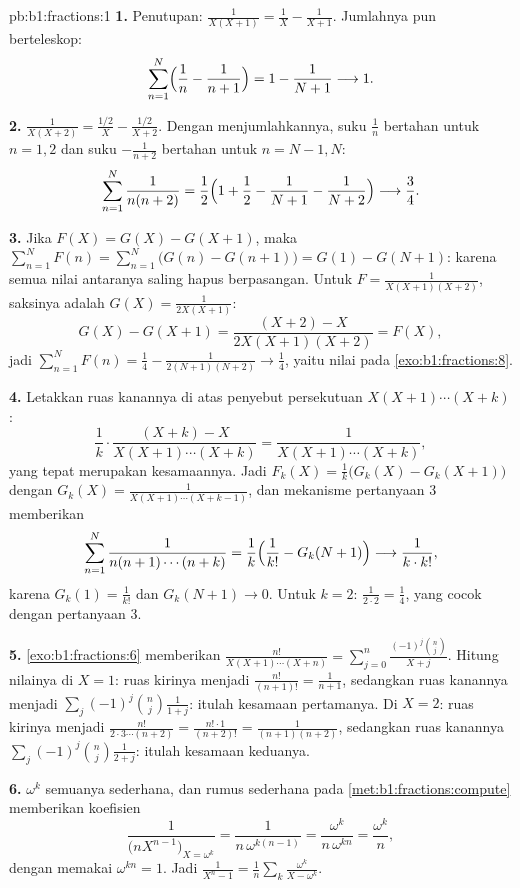 \begin{solution}{pb:b1:fractions:1}
\textbf{1.} Penutupan: $\frac1{X(X+1)} = \frac1X - \frac1{X+1}$.
Jumlahnya pun berteleskop:
\[
\sum_{n=1}^{N}\Bigl(\frac1n - \frac1{n+1}\Bigr)
= 1 - \frac1{N+1} \longrightarrow 1 .
\]

\textbf{2.} $\frac1{X(X+2)} = \frac{1/2}X - \frac{1/2}{X+2}$.
Dengan menjumlahkannya, suku $\frac1n$ bertahan untuk $n = 1, 2$ dan suku
$-\frac1{n+2}$ bertahan untuk $n = N-1, N$:
\[
\sum_{n=1}^{N}\frac1{n(n+2)}
= \frac12\Bigl(1 + \frac12 - \frac1{N+1} - \frac1{N+2}\Bigr)
\longrightarrow \frac34 .
\]

\textbf{3.} Jika $F(X) = G(X) - G(X+1)$, maka $\sum_{n=1}^N F(n) =
\sum_{n=1}^N\bigl(G(n) - G(n+1)\bigr) = G(1) - G(N+1)$: karena semua
nilai antaranya saling hapus berpasangan. Untuk $F =
\frac1{X(X+1)(X+2)}$, saksinya adalah $G(X) = \frac1{2X(X+1)}$:
\[
G(X) - G(X+1)
= \frac{(X+2) - X}{2X(X+1)(X+2)} = F(X) ,
\]
jadi $\sum_{n=1}^N F(n) = \frac14 - \frac1{2(N+1)(N+2)} \to
\frac14$, yaitu nilai pada \cref{exo:b1:fractions:8}.

\textbf{4.} Letakkan ruas kanannya di atas penyebut persekutuan
$X(X+1)\cdots(X+k)$:
\[
\frac1k\cdot\frac{(X + k) - X}{X(X+1)\cdots(X+k)}
= \frac{1}{X(X+1)\cdots(X+k)} ,
\]
yang tepat merupakan kesamaannya. Jadi $F_k(X) = \frac1k\bigl(G_k(X) -
G_k(X+1)\bigr)$ dengan $G_k(X) = \frac1{X(X+1)\cdots(X+k-1)}$, dan
mekanisme pertanyaan 3 memberikan
\[
\sum_{n=1}^{N}\frac1{n(n+1)\cdots(n+k)}
= \frac1k\Bigl(\frac1{k!} - G_k(N+1)\Bigr)
\longrightarrow \frac1{k\cdot k!} ,
\]
karena $G_k(1) = \frac1{k!}$ dan $G_k(N+1) \to 0$. Untuk $k = 2$:
$\frac1{2\cdot2} = \frac14$, yang cocok dengan pertanyaan 3.

\textbf{5.} \cref{exo:b1:fractions:6} memberikan
$\frac{n!}{X(X+1)\cdots(X+n)} = \sum_{j=0}^n
\frac{(-1)^j\binom nj}{X + j}$. Hitung nilainya di $X = 1$: ruas kirinya
menjadi $\frac{n!}{(n+1)!} = \frac1{n+1}$, sedangkan ruas kanannya menjadi
$\sum_j(-1)^j\binom nj\frac1{1+j}$: itulah kesamaan pertamanya. Di $X = 2$:
ruas kirinya menjadi $\frac{n!}{2\cdot3\cdots(n+2)} =
\frac{n!\cdot1}{(n+2)!} = \frac1{(n+1)(n+2)}$, sedangkan ruas kanannya
$\sum_j(-1)^j\binom nj\frac1{2+j}$: itulah kesamaan keduanya.

\textbf{6.}  $\omega^k$ semuanya sederhana, dan rumus 
sederhana pada \cref{met:b1:fractions:compute} memberikan koefisien
\[
\frac{1}{\bigl(nX^{n-1}\bigr)_{X = \omega^k}}
= \frac{1}{n\,\omega^{k(n-1)}}
= \frac{\omega^k}{n\,\omega^{kn}} = \frac{\omega^k}n ,
\]
dengan memakai $\omega^{kn} = 1$. Jadi $\frac1{X^n-1} = \frac1n\sum_k
\frac{\omega^k}{X - \omega^k}$.


\end{solution}
